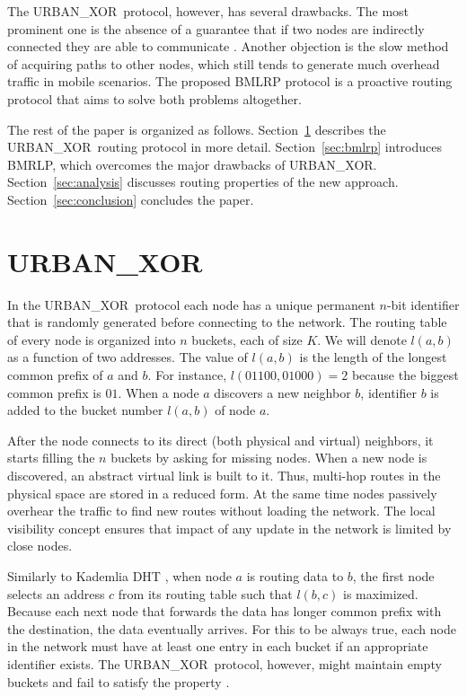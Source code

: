 \documentclass[conference]{IEEEtran}
\theoremstyle{definition}
\newcommand{\urbanxor}{URBAN\_XOR}
\begin{document}
The \urbanxor\ protocol, however, has several drawbacks. The most prominent one is the absence of a guarantee that if two nodes are indirectly connected they are able to communicate \cite{Pasquini}. Another objection is the slow method of acquiring paths to other nodes, which still tends to generate much overhead traffic in mobile scenarios. The proposed BMLRP protocol is a proactive routing protocol that aims to solve both problems altogether.

The rest of the paper is organized as follows. Section~\ref{sec:urbanxor} describes the \urbanxor\ routing protocol in more detail. Section~\ref{sec:bmlrp} introduces BMRLP, which overcomes the major drawbacks of \urbanxor. 
Section~\ref{sec:analysis} discusses routing properties of the new approach. 
Section~\ref{sec:conclusion} concludes the paper.


\section{\urbanxor}
\label{sec:urbanxor}

In the \urbanxor\ protocol each node has a unique permanent $n$-bit identifier that is randomly generated before connecting to the network. The routing table of every node is organized into $n$ buckets, each of size $K$. We will denote $l(a,b)$ as a function of two addresses. The value of $l(a,b)$ is the length of the longest common prefix of $a$ and $b$. For instance, $l(01100, 01000) = 2$ because the biggest common prefix is $01$. When a node $a$ discovers a new neighbor $b$, identifier $b$ is added to the bucket number $l(a,b)$ of node $a$.

After the node connects to its direct (both physical and virtual) neighbors, it starts filling the $n$ buckets by asking for missing nodes. When a new node is discovered, an abstract virtual link is built to it. Thus, multi-hop routes in the physical space are stored in a reduced form. At the same time nodes passively overhear the traffic to find new routes without loading the network. The local visibility concept ensures that impact of any update in the network is limited by close nodes.

Similarly to Kademlia DHT \cite{kademlia}, when node $a$ is routing data to $b$, the first node selects an address $c$ from its routing table such that $l(b,c)$ is maximized. Because each next node that forwards the data has longer common prefix with the destination, the data eventually arrives. For this to be always true, each node in the network must have at least one entry in each bucket if an appropriate identifier exists. The \urbanxor\ protocol, however, might maintain empty buckets and fail to satisfy the property \cite{Pasquini}.
\end{document}
